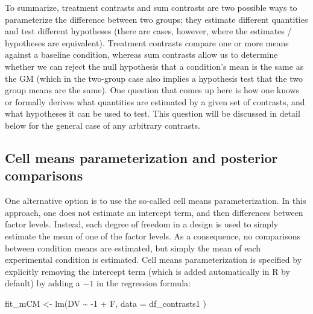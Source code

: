 \documentclass[
  12pt,
]{krantz}
\newenvironment{Shaded}{\begin{snugshade}}{\end{snugshade}}
\newcommand{\AttributeTok}[1]{\textcolor[rgb]{0.77,0.63,0.00}{#1}}
\newcommand{\DecValTok}[1]{\textcolor[rgb]{0.00,0.00,0.81}{#1}}
\newcommand{\FunctionTok}[1]{\textcolor[rgb]{0.00,0.00,0.00}{#1}}
\newcommand{\NormalTok}[1]{#1}
\newcommand{\OtherTok}[1]{\textcolor[rgb]{0.56,0.35,0.01}{#1}}
\newcommand{\SpecialCharTok}[1]{\textcolor[rgb]{0.00,0.00,0.00}{#1}}
\theoremstyle{definition}
\theoremstyle{definition}
\theoremstyle{definition}
\theoremstyle{definition}
\theoremstyle{remark}
\begin{document}
To summarize, treatment contrasts and sum contrasts are two possible ways to parameterize the difference between two groups; they estimate different quantities and test different hypotheses (there are cases, however, where the estimates / hypotheses are equivalent). Treatment contrasts compare one or more means against a baseline condition, whereas sum contrasts allow us to determine whether we can reject the null hypothesis that a condition's mean is the same as the GM (which in the two-group case also implies a hypothesis test that the two group means are the same). One question that comes up here is how one knows or formally derives what quantities are estimated by a given set of contrasts, and what hypotheses it can be used to test. This question will be discussed in detail below for the general case of any arbitrary contrasts.

\hypertarget{sec:cellMeans}{%
\subsection{Cell means parameterization and posterior comparisons}\label{sec:cellMeans}}

One alternative option is to use the so-called cell means parameterization. In this approach, one does not estimate an intercept term, and then differences between factor levels. Instead, each degree of freedom in a design is used to simply estimate the mean of one of the factor levels. As a consequence, no comparisons between condition means are estimated, but simply the mean of each experimental condition is estimated. Cell means parameterization is specified by explicitly removing the intercept term (which is added automatically in R by default) by adding a \(-1\) in the regression formula:

\begin{Shaded}
\begin{Highlighting}[]
\NormalTok{fit\_mCM }\OtherTok{\textless{}{-}} \FunctionTok{lm}\NormalTok{(DV }\SpecialCharTok{\textasciitilde{}} \SpecialCharTok{{-}}\DecValTok{1} \SpecialCharTok{+}\NormalTok{ F,}
  \AttributeTok{data =}\NormalTok{ df\_contrasts1}
\NormalTok{)}
\end{Highlighting}
\end{Shaded}

\begin{Shaded}
\end{Shaded}
\end{document}
